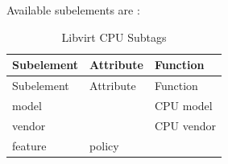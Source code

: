 \documentclass[
  14pt,
  english,
  a4paper,
]{scrreprt}
\begin{document}
Available subelements are :

\hypertarget{tbl:lvirt_cpu_subtags}{}
\begin{longtable}[]{@{}lll@{}}
\caption{\label{tbl:lvirt_cpu_subtags}Libvirt CPU
Subtags}\tabularnewline
\toprule
\begin{minipage}[b]{0.16\columnwidth}\raggedright
Subelement\strut
\end{minipage} & \begin{minipage}[b]{0.15\columnwidth}\raggedright
Attribute\strut
\end{minipage} & \begin{minipage}[b]{0.27\columnwidth}\raggedright
Function\strut
\end{minipage}\tabularnewline
\midrule
\endfirsthead
\toprule
\begin{minipage}[b]{0.16\columnwidth}\raggedright
Subelement\strut
\end{minipage} & \begin{minipage}[b]{0.15\columnwidth}\raggedright
Attribute\strut
\end{minipage} & \begin{minipage}[b]{0.27\columnwidth}\raggedright
Function\strut
\end{minipage}\tabularnewline
\midrule
\endhead
\begin{minipage}[t]{0.16\columnwidth}\raggedright
model\strut
\end{minipage} & \begin{minipage}[t]{0.15\columnwidth}\raggedright
\strut
\end{minipage} & \begin{minipage}[t]{0.27\columnwidth}\raggedright
CPU model\strut
\end{minipage}\tabularnewline
\begin{minipage}[t]{0.16\columnwidth}\raggedright
vendor\strut
\end{minipage} & \begin{minipage}[t]{0.15\columnwidth}\raggedright
\strut
\end{minipage} & \begin{minipage}[t]{0.27\columnwidth}\raggedright
CPU vendor\strut
\end{minipage}\tabularnewline
\begin{minipage}[t]{0.16\columnwidth}\raggedright
feature\strut
\end{minipage} & \begin{minipage}[t]{0.15\columnwidth}\raggedright
policy\strut
\end{minipage} & \begin{minipage}[t]{0.27\columnwidth}\raggedright

\end{minipage}
\end{longtable}
\end{document}
